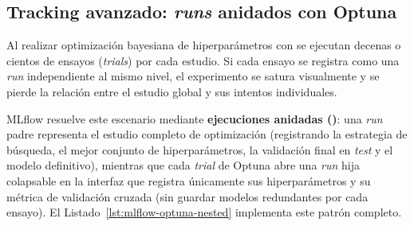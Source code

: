 \subsection{Tracking avanzado: \textit{runs} anidados con Optuna}

Al realizar optimización bayesiana de hiperparámetros con  se ejecutan decenas o cientos de ensayos (\textit{trials}) por cada estudio. Si cada ensayo se registra como una \textit{run} independiente al mismo nivel, el experimento se satura visualmente y se pierde la relación entre el estudio global y sus intentos individuales.

MLflow resuelve este escenario mediante \textbf{ejecuciones anidadas ()}: una \textit{run} padre representa el estudio completo de optimización (registrando la estrategia de búsqueda, el mejor conjunto de hiperparámetros, la validación final en \textit{test} y el modelo definitivo), mientras que cada \textit{trial} de Optuna abre una \textit{run} hija colapsable en la interfaz que registra únicamente sus hiperparámetros y su métrica de validación cruzada (sin guardar modelos redundantes por cada ensayo). El Listado~\ref{lst:mlflow-optuna-nested} implementa este patrón completo.

